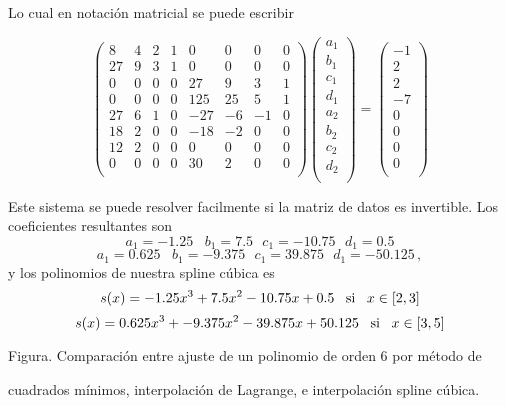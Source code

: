 \documentclass[
]{agujournal2019}
\begin{document}
Lo cual en notación matricial se puede escribir

\[\left(\begin{array}{cccccccc}
  8 & 4 & 2 & 1 & 0 & 0 & 0 & 0\\
  27 & 9 & 3 & 1 & 0 & 0 & 0 & 0\\
  0 & 0 & 0 & 0 & 27 & 9 & 3 & 1\\
  0 & 0 & 0 & 0 & 125 & 25 & 5 & 1\\
  27 & 6 & 1 & 0 & -27 & -6 & -1 & 0\\
  18 & 2 & 0 & 0 & -18 & -2 & 0 & 0\\
  12 & 2 & 0 & 0 & 0 & 0 & 0 & 0\\
  0 & 0 & 0 & 0 & 30 & 2 & 0 & 0\\
    \end{array}\right)\left(\begin{array}{c}
  a_1 \\
  b_1 \\
  c_1 \\
  d_1 \\
  a_2 \\
  b_2 \\
  c_2 \\
  d_2 \\
    \end{array}\right)=
    \left(\begin{array}{c}
  -1 \\
  2 \\
  2 \\
  -7 \\
  0 \\
  0 \\
  0 \\
  0 \\
    \end{array}\right)\]

Este sistema se puede resolver facilmente si la matriz de datos es
invertible. Los coeficientes resultantes son
\[a_1=-1.25\,\,\,\,\,b_1=7.5\,\,\,\,c_1=-10.75\,\,\,\,d_1=0.5\]
\[a_1=0.625\,\,\,\,\,b_1=-9.375\,\,\,\,c_1=39.875\,\,\,\,d_1=-50.125\,,\]
y los polinomios de nuestra spline cúbica es
\[s(x)=-1.25x^3+7.5x^2-10.75x+0.5\,\,\,\,\,{\rm si}\,\,\,\,\,x\in[2,3]\]
\[s(x)=0.625x^3+-9.375x^2-39.875x+50.125\,\,\,\,\,{\rm si}\,\,\,\,\,x\in[3,5]\]

\centerline{Figura. Comparación entre ajuste de un polinomio de orden 6
por método de}
\centerline{cuadrados mínimos, interpolación de Lagrange, e interpolación
spline cúbica.}
\end{document}
